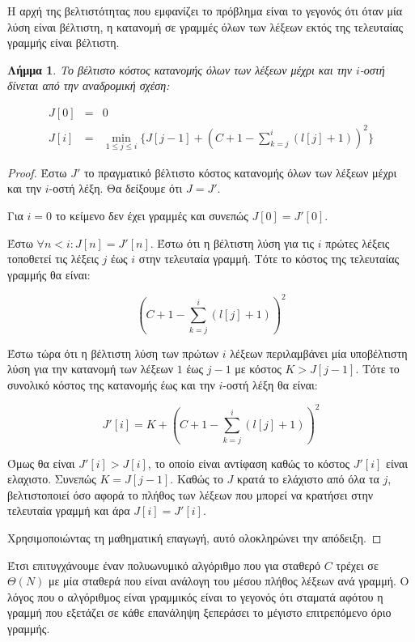 \documentclass[11pt,a4paper]{book}
\newtheorem*{lemma}{Λήμμα}
\begin{document}
Η αρχή της βελτιστότητας που εμφανίζει το πρόβλημα είναι το γεγονός ότι όταν μία λύση είναι βέλτιστη, η κατανομή σε γραμμές όλων των λέξεων εκτός της τελευταίας γραμμής είναι βέλτιστη.

\begin{lemma}
Το βέλτιστο κόστος κατανομής όλων των λέξεων μέχρι και την $i$-οστή δίνεται από την αναδρομική σχέση:

\begin{align*}
J[ 0 ] &=& 0 \\
J[ i ] &=& \min_{1 \leq j \leq i}\{ J[ j - 1 ] + ( C + 1 - \sum_{k=j}^i(l[j] + 1) )^2 \}
\end{align*}
\end{lemma}
\begin{proof}
Έστω $J'$ το πραγματικό βέλτιστο κόστος κατανομής όλων των λέξεων μέχρι και την $i$-οστή λέξη. Θα δείξουμε ότι $J = J'$.

Για $i = 0$ το κείμενο δεν έχει γραμμές και συνεπώς $J[ 0 ] = J'[ 0 ]$.

Έστω $\forall n < i: J[ n ] = J'[ n ]$. Έστω ότι η βέλτιστη λύση για τις $i$ πρώτες λέξεις τοποθετεί τις λέξεις $j$ έως $i$ στην τελευταία γραμμή. Τότε το κόστος της τελευταίας γραμμής θα είναι:

\[
( C + 1 - \sum_{k=j}^i(l[j] + 1) )^2
\]

Έστω τώρα ότι η βέλτιστη λύση των πρώτων $i$ λέξεων περιλαμβάνει μία υποβέλτιστη λύση για την κατανομή των λέξεων $1$ έως $j - 1$ με κόστος $K > J[ j - 1 ]$. Τότε το συνολικό κόστος της κατανομής έως και την $i$-οστή λέξη θα είναι:

\[
J'[ i ] = K + ( C + 1 - \sum_{k=j}^i(l[j] + 1) )^2
\]

Όμως θα είναι $J'[ i ] > J[ i ]$, το οποίο είναι αντίφαση καθώς το κόστος $J'[ i ]$ είναι ελαχιστο. Συνεπώς $K = J[ j - 1 ]$. Καθώς το $J$ κρατά το ελάχιστο από όλα τα $j$, βελτιστοποιεί όσο αφορά το πλήθος των λέξεων που μπορεί να κρατήσει στην τελευταία γραμμή και άρα $J[ i ] = J'[ i ]$.

Χρησιμοποιώντας τη μαθηματική επαγωγή, αυτό ολοκληρώνει την απόδειξη.
\end{proof}

Έτσι επιτυγχάνουμε έναν πολυωνυμικό αλγόριθμο που για σταθερό $C$ τρέχει σε $\Theta( N )$ με μία σταθερά που είναι ανάλογη του μέσου πλήθος λέξεων ανά γραμμή. Ο λόγος που ο αλγόριθμος είναι γραμμικός είναι το γεγονός ότι σταματά αφότου η γραμμή που εξετάζει σε κάθε επανάληψη ξεπεράσει το μέγιστο επιτρεπόμενο όριο γραμμής.
\end{document}
